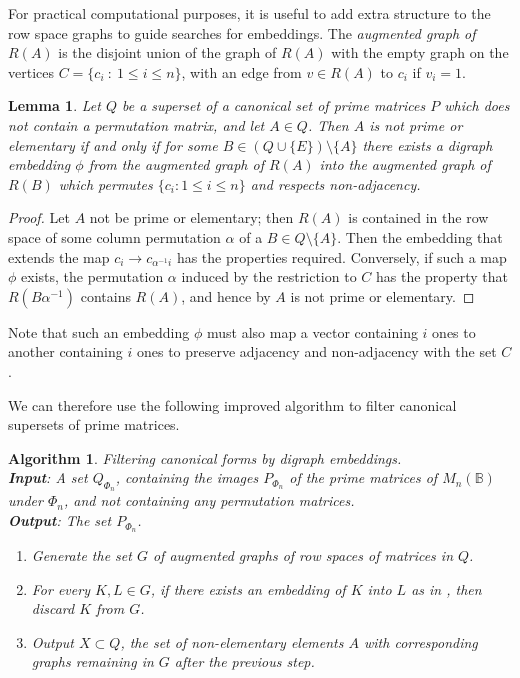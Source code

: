\documentclass[11pt]{article}
\newtheorem{lemma}[thm]{Lemma}
\newtheorem{algo}[thm]{Algorithm}
\newenvironment{alg}{\begin{algo}\rm}{\end{algo}}
\numberwithin{equation}{section}
\renewcommand{\to}{\longrightarrow}
\newcommand{\B}{\mathbb{B}}
\newcommand{\Bn}{M_n(\B)}
\begin{document}
For practical computational purposes, it is useful to add extra structure to the
row space graphs to guide searches for embeddings. The \emph{augmented graph of
  $R(A)$} is the disjoint union of the graph of $R(A)$ with the empty graph on
the vertices $C = \{c_i \: : \: 1 \leq i \leq n\}$, with an edge from $v \in R(A)$
to $c_i$ if $v_i = 1$.

\begin{lemma}
  Let $Q$ be a superset of a canonical set of prime matrices $P$ which does not
  contain a permutation matrix, and let $A \in
  Q$. Then $A$ is not prime or elementary if and only if for some $B \in
  (Q\cup\{E\})\setminus\{A\}$ there exists a digraph embedding
  $\phi$ from the augmented graph of $R(A)$ into the augmented graph of $R(B)$
  which permutes $\{ c_i : 1 \leq i \leq n \}$ and respects non-adjacency.
\end{lemma}
\begin{proof}
  Let $A$ not be prime or elementary; then $R(A)$ is contained in the row space
  of some column permutation $\alpha$ of a $B \in Q \setminus \{A\}$.
  Then the embedding that extends the map $c_i \to c_{\alpha^{-1}i}$ has the
  properties required. Conversely, if such a map $\phi$ exists, the permutation
  $\alpha$ induced by the restriction to $C$ has the property that
  $R(B\alpha^{-1})$ contains $R(A)$, and hence by 
  $A$ is not prime or elementary. 
\end{proof}

Note that such an embedding $\phi$ must also map a vector containing $i$ ones to
another containing $i$ ones to preserve adjacency and non-adjacency with the set
$C$.

We can therefore use the following improved algorithm to filter canonical
supersets of prime matrices.

\begin{alg}
   Filtering canonical forms by digraph embeddings.\\
  \textbf{Input}: A set $Q_{\Phi_n}$, containing the images $P_{\Phi_n}$ of the
  prime matrices of $\Bn$ under $\Phi_n$, and not containing any permutation
  matrices. \\
  \textbf{Output}: The set $P_{\Phi_n}$.
  \begin{enumerate}
  \item
    Generate the set $G$ of augmented graphs of row spaces of matrices in $Q$.
  \item 
    For every $K, L \in G$, if there exists an embedding of $K$ into $L$ as in
    , then discard $K$ from $G$.
  \item
    Output $X\subset Q$, the set of non-elementary elements $A$ with
    corresponding graphs remaining in $G$ after the previous step.
\end{enumerate}
\end{alg}
\end{document}
